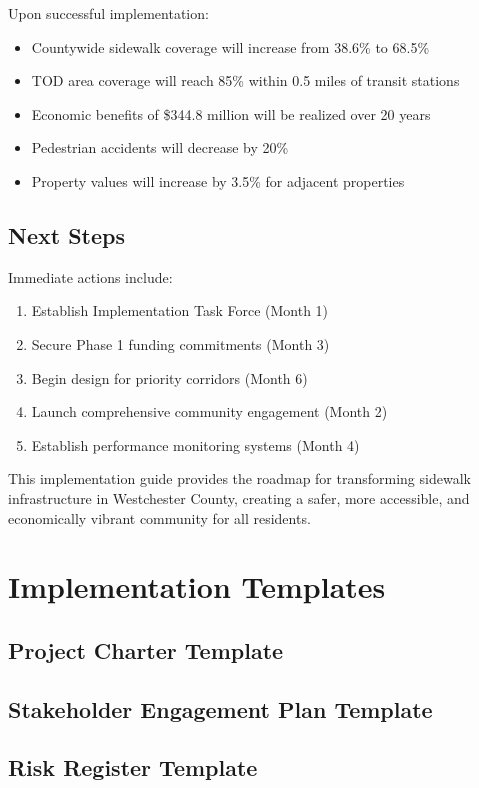 \documentclass[11pt,letterpaper]{article}
\begin{document}
Upon successful implementation:
\begin{itemize}
    \item Countywide sidewalk coverage will increase from 38.6\% to 68.5\%
    \item TOD area coverage will reach 85\% within 0.5 miles of transit stations
    \item Economic benefits of \$344.8 million will be realized over 20 years
    \item Pedestrian accidents will decrease by 20\%
    \item Property values will increase by 3.5\% for adjacent properties
\end{itemize}

\subsection{Next Steps}

Immediate actions include:
\begin{enumerate}
    \item Establish Implementation Task Force (Month 1)
    \item Secure Phase 1 funding commitments (Month 3)
    \item Begin design for priority corridors (Month 6)
    \item Launch comprehensive community engagement (Month 2)
    \item Establish performance monitoring systems (Month 4)
\end{enumerate}

This implementation guide provides the roadmap for transforming sidewalk infrastructure in Westchester County, creating a safer, more accessible, and economically vibrant community for all residents.

\appendix

\section{Implementation Templates}

\subsection{Project Charter Template}
\subsection{Stakeholder Engagement Plan Template}
\subsection{Risk Register Template}
\end{document}
